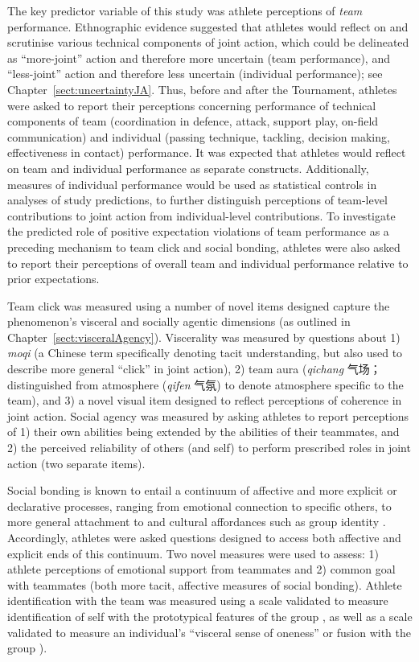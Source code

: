 \begin{CJK}{UTF8}{gbsn}
The key predictor variable of this study was athlete perceptions of \textit{team} performance.  Ethnographic evidence suggested that athletes would reflect on and scrutinise various technical components of joint action, which could be delineated as ``more-joint'' action and therefore more uncertain (team performance), and ``less-joint'' action and therefore less uncertain (individual performance); see Chapter~\ref{sect:uncertaintyJA}.  Thus, before and after the Tournament, athletes were asked to report their perceptions concerning performance of technical components of team (coordination in defence, attack, support play, on-field communication) and individual (passing technique, tackling, decision making, effectiveness in contact) performance.  It was expected that athletes would reflect on team and individual performance as separate constructs.  Additionally, measures of individual performance would be used as statistical controls in analyses of study predictions, to further distinguish perceptions of team-level contributions to joint action from individual-level contributions. To investigate the predicted role of positive expectation violations of team performance as a preceding mechanism to team click and social bonding, athletes were also asked to report their perceptions of overall team and individual performance relative to prior expectations.

Team click was measured using a number of novel items designed capture the phenomenon's visceral and socially agentic dimensions (as outlined in Chapter~\ref{sect:visceralAgency}).  Viscerality was measured by questions about 1) \textit{moqi} (a Chinese term specifically denoting tacit understanding, but also used to describe more general ``click'' in joint action), 2) team aura (\textit{qichang} 气场；distinguished from atmosphere (\textit{qifen} 气氛) to denote atmosphere specific to the team), and 3) a novel visual item designed to reflect perceptions of coherence in joint action.  Social agency was measured by asking athletes to report perceptions of 1) their own abilities being extended by the abilities of their teammates, and 2) the perceived reliability of others (and self) to perform prescribed roles in joint action (two separate items).

Social bonding is known to entail a continuum of affective and more explicit or declarative processes, ranging from emotional connection to specific others, to more general attachment to and cultural affordances such as group identity \citep{Dunbar2010,Whitehouse2014}.  Accordingly, athletes were asked questions designed to  access both affective and explicit ends of this continuum.  Two novel measures were used to assess: 1) athlete perceptions of emotional support from teammates and 2) common goal with teammates (both more tacit, affective measures of social bonding).  Athlete identification with the team was measured using a scale validated to measure identification of self with the prototypical features of the group \citep[Group Identification, see][]{Turner1987}, as well as a scale validated to measure an individual's ``visceral sense of oneness'' or fusion with the group \citep[Identity Fusion; see][]{Swann2009}).


\end{CJK}
